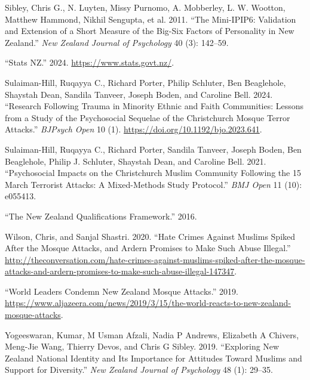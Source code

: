 \documentclass[
]{interact}
\newlength{\cslhangindent}
\newenvironment{CSLReferences}[2] %
 {\begin{list}{}{%
  \setlength{\itemindent}{0pt}
  \setlength{\leftmargin}{0pt}
  \setlength{\parsep}{0pt}
  \ifodd #1
   \setlength{\leftmargin}{\cslhangindent}
   \setlength{\itemindent}{-1\cslhangindent}
  \fi
  \setlength{\itemsep}{#2\baselineskip}}}
 {\end{list}}
\begin{document}
\begin{CSLReferences}{1}{0}
Sibley, Chris G., N. Luyten, Missy Purnomo, A. Mobberley, L. W. Wootton,
Matthew Hammond, Nikhil Sengupta, et al. 2011. {``The Mini-IPIP6:
Validation and Extension of a Short Measure of the {B}ig-{S}ix Factors
of Personality in {N}ew {Z}ealand.''} \emph{New Zealand Journal of
Psychology} 40 (3): 142--59.

{``Stats NZ.''} 2024. \url{https://www.stats.govt.nz/}.

Sulaiman-Hill, Ruqayya C., Richard Porter, Philip Schluter, Ben
Beaglehole, Shaystah Dean, Sandila Tanveer, Joseph Boden, and Caroline
Bell. 2024. {``Research Following Trauma in Minority Ethnic and Faith
Communities: Lessons from a Study of the Psychosocial Sequelae of the
Christchurch Mosque Terror Attacks.''} \emph{BJPsych Open} 10 (1).
\url{https://doi.org/10.1192/bjo.2023.641}.

Sulaiman-Hill, Ruqayya C., Richard Porter, Sandila Tanveer, Joseph
Boden, Ben Beaglehole, Philip J. Schluter, Shaystah Dean, and Caroline
Bell. 2021. {``Psychosocial Impacts on the {C}hristchurch {M}uslim
Community Following the 15 March Terrorist Attacks: A Mixed-Methods
Study Protocol.''} \emph{BMJ Open} 11 (10): e055413.

{``The New Zealand Qualifications Framework.''} 2016.

Wilson, Chris, and Sanjal Shastri. 2020. {``Hate Crimes Against
{M}uslims Spiked After the Mosque Attacks, and {A}rdern Promises to Make
Such Abuse Illegal.''}
\url{http://theconversation.com/hate-crimes-against-muslims-spiked-after-the-mosque-attacks-and-ardern-promises-to-make-such-abuse-illegal-147347}.

{``World Leaders Condemn New Zealand Mosque Attacks.''} 2019.
\url{https://www.aljazeera.com/news/2019/3/15/the-world-reacts-to-new-zealand-mosque-attacks}.

Yogeeswaran, Kumar, M Usman Afzali, Nadia P Andrews, Elizabeth A
Chivers, Meng-Jie Wang, Thierry Devos, and Chris G Sibley. 2019.
{``Exploring {N}ew {Z}ealand National Identity and Its Importance for
Attitudes Toward {M}uslims and Support for Diversity.''} \emph{New
Zealand Journal of Psychology} 48 (1): 29--35.

\end{CSLReferences}
\end{document}
